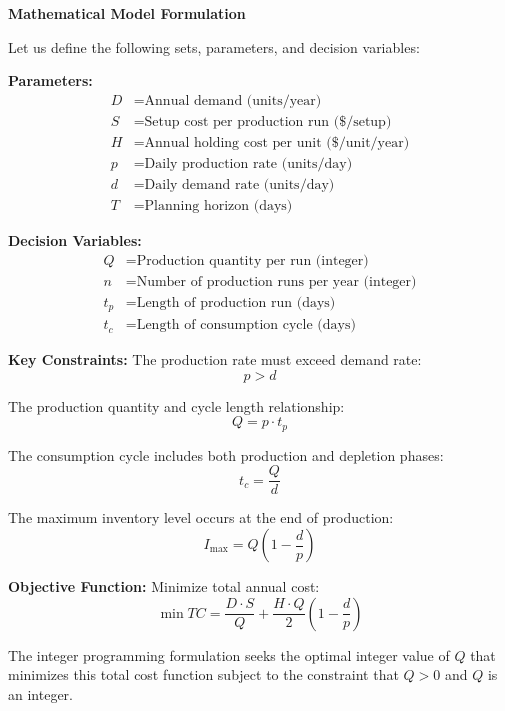\documentclass{article}
\begin{document}
\textbf{Mathematical Model Formulation}

Let us define the following sets, parameters, and decision variables:

\textbf{Parameters:}
\begin{align}
D &= \text{Annual demand (units/year)} \\
S &= \text{Setup cost per production run (\$/setup)} \\
H &= \text{Annual holding cost per unit (\$/unit/year)} \\
p &= \text{Daily production rate (units/day)} \\
d &= \text{Daily demand rate (units/day)} \\
T &= \text{Planning horizon (days)}
\end{align}

\textbf{Decision Variables:}
\begin{align}
Q &= \text{Production quantity per run (integer)} \\
n &= \text{Number of production runs per year (integer)} \\
t_p &= \text{Length of production run (days)} \\
t_c &= \text{Length of consumption cycle (days)}
\end{align}

\textbf{Key Constraints:}
The production rate must exceed demand rate:
\begin{equation}
p > d
\end{equation}

The production quantity and cycle length relationship:
\begin{equation}
Q = p \cdot t_p
\end{equation}

The consumption cycle includes both production and depletion phases:
\begin{equation}
t_c = \frac{Q}{d}
\end{equation}

The maximum inventory level occurs at the end of production:
\begin{equation}
I_{\max} = Q\left(1 - \frac{d}{p}\right)
\end{equation}

\textbf{Objective Function:}
Minimize total annual cost:
\begin{equation}
\min TC = \frac{D \cdot S}{Q} + \frac{H \cdot Q}{2}\left(1 - \frac{d}{p}\right)
\end{equation}

The integer programming formulation seeks the optimal integer value of $Q$ that minimizes this total cost function subject to the constraint that $Q > 0$ and $Q$ is an integer.
\end{document}
